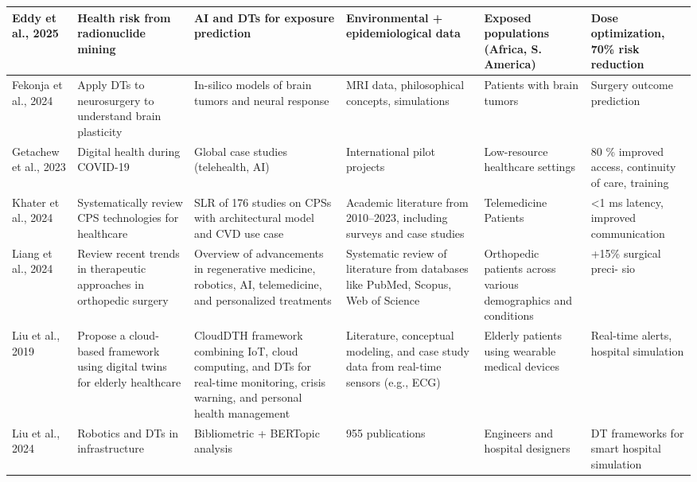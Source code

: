 \documentclass[10pt,a4paper]{article}
\begin{document}
\begin{small}
\begin{longtable}{|p{2cm}|p{2.8cm}|p{2.8cm}|p{2cm}|p{2cm}|p{3.2cm}|}
Eddy et al., 2025 & Health risk from radionuclide mining & AI and DTs for exposure prediction & Environmental + epidemiological data & Exposed populations (Africa, S. America) & Dose optimization, 70\% risk reduction \\
\hline
Fekonja et al., 2024 & Apply DTs to neurosurgery to understand brain plasticity & In-silico models of brain tumors and neural response & MRI data, philosophical concepts, simulations & Patients with brain tumors & Surgery outcome prediction \\
\hline
Getachew et al., 2023 & Digital health during COVID-19 & Global case studies (telehealth, AI) & International pilot projects & Low-resource healthcare settings & 80 \% improved access, continuity of care, training \\
\hline
Khater et al., 2024 & Systematically review CPS technologies for healthcare & SLR of 176 studies on CPSs with architectural model and CVD use case & Academic literature from 2010–2023, including surveys and case studies & Telemedicine Patients & <1 ms latency, improved communication \\
\hline

Liang et al., 2024 & Review recent trends in therapeutic approaches in orthopedic surgery & Overview of advancements in regenerative medicine, robotics, AI, telemedicine, and personalized treatments & Systematic review of literature from databases like PubMed, Scopus, Web of Science & Orthopedic patients across various demographics and conditions & +15\% surgical preci-
sio \\
\hline

Liu et al., 2019 & Propose a cloud-based framework using digital twins for elderly healthcare & CloudDTH framework combining IoT, cloud computing, and DTs for real-time monitoring, crisis warning, and personal health management & Literature, conceptual modeling, and case study data from real-time sensors (e.g., ECG) & Elderly patients using wearable medical devices & Real-time alerts, hospital simulation \\
\hline



Liu et al., 2024 & Robotics and DTs in infrastructure & Bibliometric + BERTopic analysis & 955 publications & Engineers and hospital designers & DT frameworks for smart hospital simulation \\
\hline


\end{longtable}
\end{small}
\end{document}
